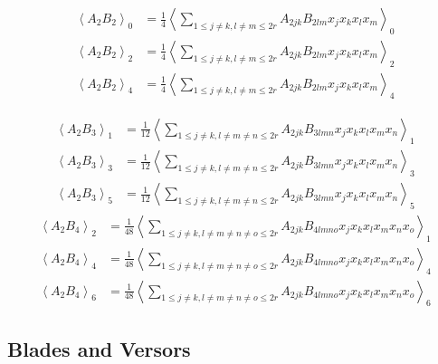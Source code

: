 \documentclass[aps,preprint]{revtex4}%
\begin{document}
\begin{align}
\left\langle A_{2}B_{2}\right\rangle _{0}  &  =\frac{1}{4}\left\langle
\sum_{1\leq j\neq k,l\neq m\leq2r}A_{2jk}B_{2lm}x_{j}x_{k}x_{l}x_{m}%
\right\rangle _{0}\\
\left\langle A_{2}B_{2}\right\rangle _{2}  &  =\frac{1}{4}\left\langle
\sum_{1\leq j\neq k,l\neq m\leq2r}A_{2jk}B_{2lm}x_{j}x_{k}x_{l}x_{m}%
\right\rangle _{2}\\
\left\langle A_{2}B_{2}\right\rangle _{4}  &  =\frac{1}{4}\left\langle
\sum_{1\leq j\neq k,l\neq m\leq2r}A_{2jk}B_{2lm}x_{j}x_{k}x_{l}x_{m}%
\right\rangle _{4}%
\end{align}
%

\begin{align}
\left\langle A_{2}B_{3}\right\rangle _{1}  &  =\frac{1}{12}\left\langle
\sum_{1\leq j\neq k,l\neq m\neq n\leq2r}A_{2jk}B_{3lmn}x_{j}x_{k}x_{l}%
x_{m}x_{n}\right\rangle _{1}\\
\left\langle A_{2}B_{3}\right\rangle _{3}  &  =\frac{1}{12}\left\langle
\sum_{1\leq j\neq k,l\neq m\neq n\leq2r}A_{2jk}B_{3lmn}x_{j}x_{k}x_{l}%
x_{m}x_{n}\right\rangle _{3}\\
\left\langle A_{2}B_{3}\right\rangle _{5}  &  =\frac{1}{12}\left\langle
\sum_{1\leq j\neq k,l\neq m\neq n\leq2r}A_{2jk}B_{3lmn}x_{j}x_{k}x_{l}%
x_{m}x_{n}\right\rangle _{5}%
\end{align}%
\begin{align}
\left\langle A_{2}B_{4}\right\rangle _{2}  &  =\frac{1}{48}\left\langle
\sum_{1\leq j\neq k,l\neq m\neq n\neq o\leq2r}A_{2jk}B_{4lmno}x_{j}x_{k}%
x_{l}x_{m}x_{n}x_{o}\right\rangle _{1}\\
\left\langle A_{2}B_{4}\right\rangle _{4}  &  =\frac{1}{48}\left\langle
\sum_{1\leq j\neq k,l\neq m\neq n\neq o\leq2r}A_{2jk}B_{4lmno}x_{j}x_{k}%
x_{l}x_{m}x_{n}x_{o}\right\rangle _{4}\\
\left\langle A_{2}B_{4}\right\rangle _{6}  &  =\frac{1}{48}\left\langle
\sum_{1\leq j\neq k,l\neq m\neq n\neq o\leq2r}A_{2jk}B_{4lmno}x_{j}x_{k}%
x_{l}x_{m}x_{n}x_{o}\right\rangle _{6}%
\end{align}


\subsection{Blades and Versors}
\end{document}
